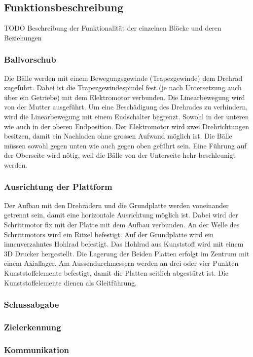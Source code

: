 \subsection{Funktionsbeschreibung}
TODO Beschreibung der Funktionalität der einzelnen Blöcke und deren Beziehungen 
\subsubsection{Ballvorschub}
Die Bälle werden mit einem Bewegungsgewinde (Trapezgewinde) dem Drehrad zugeführt. Dabei ist die Trapezgewindespindel fest (je nach Untersetzung auch über ein Getriebe) mit dem Elektromotor verbunden. Die Linearbewegung wird von der Mutter ausgeführt. Um eine Beschädigung des Drehrades zu verhindern, wird die Linearbewegung mit einem Endschalter begrenzt. Sowohl in der unteren wie auch in der oberen Endposition. Der Elektromotor wird zwei Drehrichtungen besitzen, damit ein Nachladen ohne grossen Aufwand möglich ist. Die Bälle müssen sowohl gegen unten wie auch gegen oben geführt sein. Eine Führung auf der Oberseite wird nötig, weil die Bälle von der Unterseite hehr beschleunigt werden.
\subsubsection{Ausrichtung der Plattform}
Der Aufbau mit den Drehrädern und die Grundplatte werden voneinander getrennt sein, damit eine horizontale Ausrichtung möglich ist. Dabei wird der Schrittmotor fix mit der Platte mit dem Aufbau verbunden. An der Welle des Schrittmotors wird ein Ritzel befestigt. Auf der Grundplatte wird ein innenverzahntes Hohlrad befestigt. Das Hohlrad aus Kunststoff wird mit einem 3D Drucker hergestellt. Die Lagerung der Beiden Platten erfolgt im Zentrum mit einem Axiallager. Am Aussendurchmessern werden an drei oder vier Punkten Kunststoffelemente befestigt, damit die Platten seitlich abgestützt ist. Die Kunststoffelemente dienen als Gleitführung.

\subsubsection{Schussabgabe}

\subsubsection{Zielerkennung}

\subsubsection{Kommunikation}
